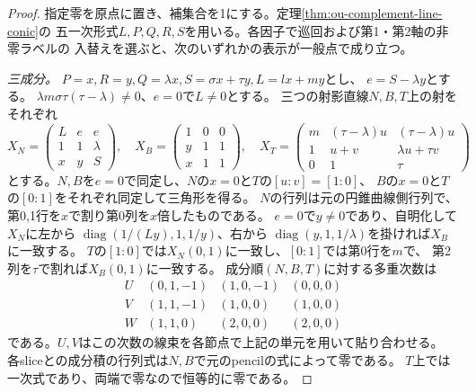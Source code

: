 \begin{proof}
指定零を原点に置き、補集合を1にする。定理\ref{thm:ou-complement-line-conic}の
五一次形式$L,P,Q,R,S$を用いる。各因子で巡回および第1・第2軸の非零ラベルの
入替えを選ぶと、次のいずれかの表示が一般点で成り立つ。

\emph{三成分。} $P=x,R=y,Q=\lambda x,S=\sigma x+\tau y,L=l x+m y$とし、
$e=S-\lambda y$とする。
$\lambda m\sigma\tau(\tau-\lambda)\ne0$、$e=0$で$L\ne0$とする。
三つの射影直線$N,B,T$上の射をそれぞれ
\[
 X_N=\begin{pmatrix}L&e&e\\1&1&\lambda\\x&y&S\end{pmatrix},\quad
 X_B=\begin{pmatrix}1&0&0\\y&1&1\\x&1&1\end{pmatrix},\quad
 X_T=\begin{pmatrix}m&(\tau-\lambda)u&(\tau-\lambda)u\\
 1&u+v&\lambda u+\tau v\\0&1&\tau\end{pmatrix}
\]
とする。$N,B$を$e=0$で同定し、$N$の$x=0$と$T$の$[u:v]=[1:0]$、
$B$の$x=0$と$T$の$[0:1]$をそれぞれ同定して三角形を得る。
$N$の行列は元の円錐曲線側行列で、第0,1行を$x$で割り第0列を$x$倍したものである。
$e=0$で$y\ne0$であり、自明化して$X_N$に左から
$\operatorname{diag}(1/(Ly),1,1/y)$、右から
$\operatorname{diag}(y,1,1/\lambda)$を掛ければ$X_B$に一致する。
$T$の$[1:0]$では$X_N(0,1)$に一致し、$[0:1]$では第0行を$m$で、
第2列を$\tau$で割れば$X_B(0,1)$に一致する。
成分順$(N,B,T)$に対する多重次数は
\[
\begin{array}{c|ccc}
 U&(0,1,-1)&(1,0,-1)&(0,0,0)\\
 V&(1,1,-1)&(1,0,0)&(1,0,0)\\
 W&(1,1,0)&(2,0,0)&(2,0,0)
\end{array}
\]
である。$U,V$はこの次数の線束を各節点で上記の単元を用いて貼り合わせる。
各sliceとの成分積の行列式は$N,B$で元のpencilの式によって零である。
$T$上では一次式であり、両端で零なので恒等的に零である。


\end{proof}
